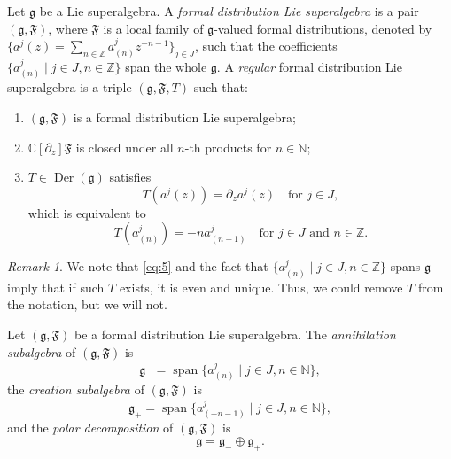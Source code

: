 \documentclass[a4paper, 12pt, reqno]{amsart}
\theoremstyle{remark}
\newtheorem{remark}[theorem]{Remark}
\numberwithin{equation}{subsection}
\DeclareMathOperator{\vspan}{span}
\DeclareMathOperator{\Der}{Der}
\begin{document}
Let $\mathfrak{g}$ be a Lie superalgebra.
A \emph{formal distribution Lie superalgebra} is a pair $(\mathfrak{g}, \mathfrak{F})$, where $\mathfrak{F}$ is a local family of $\mathfrak{g}$-valued formal distributions, denoted by $\{a^j(z) = \sum_{n \in \mathbb{Z}}a^j_{(n)}z^{-n - 1}\}_{j \in J}$, such that the coefficients $\{a^j_{(n)} \mid j \in J, n \in \mathbb{Z}\}$ span the whole $\mathfrak{g}$.
A \emph{regular} formal distribution Lie superalgebra is a triple $(\mathfrak{g}, \mathfrak{F}, T)$ such that:
\begin{enumerate}
\item $(\mathfrak{g}, \mathfrak{F})$ is a formal distribution Lie superalgebra;
\item $\mathbb{C}[\partial_z]\mathfrak{F}$ is closed under all $n$-th products for $n \in \mathbb{N}$;
\item $T \in \Der(\mathfrak{g})$ satisfies
  \begin{equation*}
    T(a^j(z)) = \partial_za^j(z) \quad \text{for }j \in J,
  \end{equation*}
  which is equivalent to
  \begin{equation}
    \label{eq:5}
    T(a^j_{(n)}) = -na^j_{(n - 1)} \quad \text{for }j \in J\text{ and }n \in \mathbb{Z}.
  \end{equation}
\end{enumerate}

\begin{remark}
  \label{rmk:6}
  We note that \eqref{eq:5} and the fact that $\{a^j_{(n)} \mid j \in J, n \in \mathbb{Z}\}$ spans $\mathfrak{g}$ imply that if such $T$ exists, it is even and unique.
  Thus, we could remove $T$ from the notation, but we will not.
\end{remark}

Let $(\mathfrak{g}, \mathfrak{F})$ be a formal distribution Lie superalgebra.
The \emph{annihilation subalgebra} of $(\mathfrak{g}, \mathfrak{F})$ is
\begin{equation*}
  \mathfrak{g}_- = \vspan\{a^j_{(n)} \mid j \in J, n \in \mathbb{N}\},
\end{equation*}
the \emph{creation subalgebra} of $(\mathfrak{g}, \mathfrak{F})$ is
\begin{equation*}
  \mathfrak{g}_+ = \vspan\{a^j_{(-n - 1)} \mid j \in J, n \in \mathbb{N}\},
\end{equation*}
and the \emph{polar decomposition} of $(\mathfrak{g}, \mathfrak{F})$ is
\begin{equation*}
  \mathfrak{g} = \mathfrak{g}_- \oplus \mathfrak{g}_+.
\end{equation*}
\end{document}
